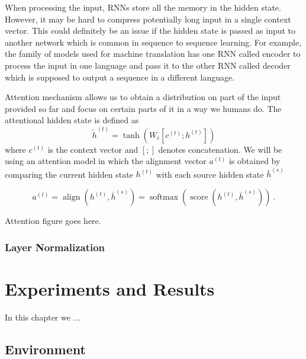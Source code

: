 \documentclass[titlepage]{report}
\DeclareMathOperator{\softmax}{softmax}
\DeclareMathOperator{\score}{score}
\DeclareMathOperator{\aln}{align}
\begin{document}
When processing the input, RNNs store all the memory in the hidden state. However, it may be hard to compress potentially long input in a single context vector.
This could definitely be an issue if the hidden state is passed as input to another network which is common in sequence to sequence learning. For example, the family of models used for machine translation has one RNN called encoder to process the input in one language and pass it to the other RNN called decoder which is supposed to output a sequence in a different language.

Attention mechanism allows us to obtain a distribution on part of the input provided so far and focus on certain parts of it in a way we humans do. The attentional hidden state is defined as
\begin{equation*}
\widetilde{h}^{(t)} = \tanh(W_c [c^{(t)}; h^{(t)}])
\end{equation*}
where $c^{(t)}$ is the context vector and $[ ; ]$ denotes concatenation. We will be using an attention model in which the alignment vector $a^{(t)}$ is obtained by comparing the current hidden state $h^{(t)}$ with each source hidden state $\bar{h}^{(s)}$

\begin{equation*}
a^{(t)} = \aln (h^{(t)}, \bar{h}^{(s)}) = \softmax(\score(h^{(t)}, \bar{h}^{(s)})) \:.
\end{equation*}

\begin{center}
Attention figure goes here.
\end{center}

\subsection{Layer Normalization}

\chapter{Experiments and Results}

In this chapter we ...

\section{Environment}
\end{document}
